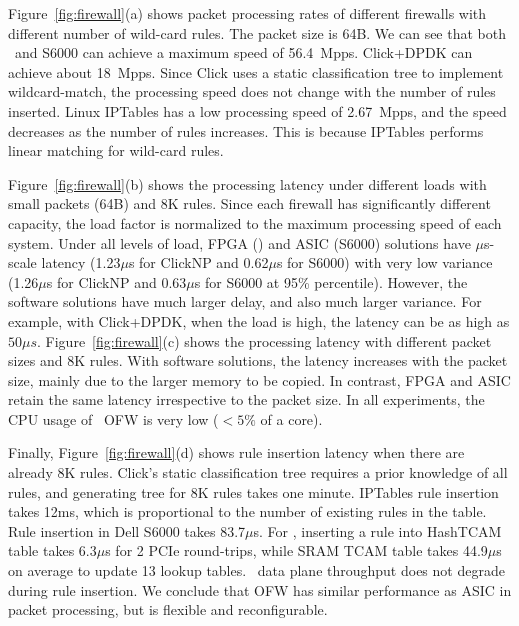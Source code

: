 Figure~\ref{fig:firewall}(a) shows packet processing rates of different firewalls with different number of wild-card rules.
The packet size is 64B.
We can see that both \name\ and S6000 can achieve a maximum speed of 56.4~Mpps. 
Click+DPDK can achieve about 18~Mpps. 
Since Click uses a static classification tree to implement wildcard-match, the processing speed 
does not change with the number of rules inserted. 
%
Linux IPTables has a low processing speed of 2.67~Mpps, and the speed decreases as the number of rules
increases. This is because IPTables performs linear matching for wild-card rules.

Figure~\ref{fig:firewall}(b) shows the processing latency under different loads with small packets (64B) and 8K rules. 
Since each firewall has significantly different capacity, the load factor is normalized to the maximum processing speed of each system. 
%
Under all levels of load, FPGA (\name) and ASIC (S6000) solutions have $\mu$s-scale latency (1.23$\mu$s for ClickNP and 0.62$\mu$s for S6000) with very low variance (1.26$\mu$s for ClickNP and 0.63$\mu$s for S6000 at 95\% percentile).
However, the software solutions have much larger delay, and also much larger variance. 
For example, with Click+DPDK, when the load is high, the latency can be as high as $50\mu s$.
%
Figure~\ref{fig:firewall}(c) shows the processing latency with different packet sizes and 8K rules.
With software solutions, the latency increases with the packet size, mainly due to the larger 
memory to be copied.
In contrast, FPGA and ASIC retain the same latency irrespective to the packet size. 
In all experiments, the CPU usage of \name\ OFW is very low ($<5\%$ of a core).

Finally, Figure~\ref{fig:firewall}(d) shows rule insertion latency when there are already 8K rules. Click's static classification tree requires a prior knowledge of all rules, and generating tree for 8K rules takes one minute.
IPTables rule insertion takes 12ms, which is proportional to the number of existing rules in the table.
Rule insertion in Dell S6000 takes 83.7$\mu$s.
For \name, inserting a rule into HashTCAM table takes 6.3$\mu$s for 2 PCIe round-trips, while SRAM TCAM table takes 44.9$\mu$s on average to update 13 lookup tables.
\name\ data plane throughput does not degrade during rule insertion.
We conclude that OFW has similar performance as ASIC in packet processing, but is flexible and reconfigurable.



